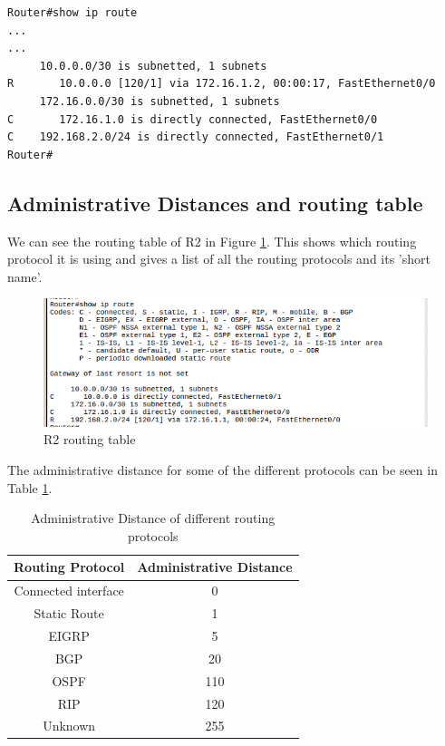 \documentclass{article}
\begin{document}
\begin{verbatim}
Router#show ip route
...
...
     10.0.0.0/30 is subnetted, 1 subnets
R       10.0.0.0 [120/1] via 172.16.1.2, 00:00:17, FastEthernet0/0
     172.16.0.0/30 is subnetted, 1 subnets
C       172.16.1.0 is directly connected, FastEthernet0/0
C    192.168.2.0/24 is directly connected, FastEthernet0/1
Router#
\end{verbatim}


\subsection{Administrative Distances and routing table}

We can see the routing table of R2 in Figure \ref{fig:2eR2route}. This shows which routing protocol it is using and gives a list of all the routing protocols and its 'short name'. 
\begin{figure}
    \centering
    \includegraphics[width=\textwidth]{2eR2route}
    \caption{R2 routing table}
    \label{fig:2eR2route}
\end{figure}

The administrative distance for some of the different protocols can be seen in Table \ref{tab:2admindist}.

\begin{table}[h]
    \centering
    \begin{tabular}{|c|c|}
         \hline
         Routing Protocol & Administrative Distance \\
         \hline 
         Connected interface & 0 \\
         Static Route & 1 \\
         EIGRP & 5\\ 
         BGP & 20 \\
         OSPF & 110 \\
         RIP & 120 \\
         Unknown & 255 \\         
    \end{tabular}
    \caption{Administrative Distance of different routing protocols}
    \label{tab:2admindist}
\end{table}
\end{document}
